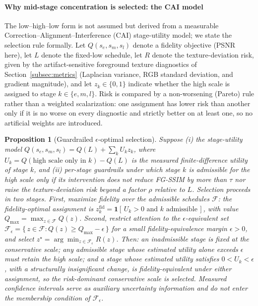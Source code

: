 \documentclass[times,twocolumn,final]{elsarticle}
\newtheorem{proposition}{Proposition} %
\providecommand{\DIFadd}[1]{{\protect\color{blue} \sf #1}} %
\providecommand{\DIFaddbegin}{} %
\newcommand{\DIFaddincludegraphics}[2][]{{\color{blue}\fbox{\DIFOincludegraphics[#1]{#2}}}} %
\DeclareRobustCommand{\DIFaddbegin}{\DIFOaddbegin \let\includegraphics\DIFaddincludegraphics} %
\begin{document}
\DIFaddbegin \paragraph{\DIFadd{Why mid-stage concentration is selected: the CAI model}}
\DIFadd{The low--high--low form is not assumed but derived from a measurable Correction--Alignment--Interference (CAI) stage-utility model; we state the selection rule formally. Let $Q(s_e,s_m,s_l)$ denote a fidelity objective (PSNR here), let $L$ denote the fixed-low schedule, let $R$ denote the texture-deviation risk, given by the artifact-sensitive foreground texture diagnostics of Section~\ref{subsec:metrics} (Laplacian variance, RGB standard deviation, and gradient magnitude), and let $z_k\in\{0,1\}$ indicate whether the high scale is assigned to stage $k\in\{e,m,l\}$. Risk is compared by a non-worsening (Pareto) rule rather than a weighted scalarization: one assignment has lower risk than another only if it is no worse on every diagnostic and strictly better on at least one, so no artificial weights are introduced.
}

\begin{proposition}[Guardrailed $\epsilon$-optimal selection]
\label{prop:cai}
\DIFadd{Suppose (i) the stage-utility model $Q(s_e,s_m,s_l)=Q(L)+\sum_{k}U_k z_k$, where $U_k=Q(\text{high scale only in }k)-Q(L)$ is the measured finite-difference utility of stage $k$, and (ii) per-stage guardrails under which stage $k$ is admissible for the high scale only if its intervention does not reduce FG-SSIM by more than $\tau$ nor raise the texture-deviation risk beyond a factor $\rho$ relative to $L$. Selection proceeds in two stages. First, maximize fidelity over the admissible schedules $\mathcal{F}$: the fidelity-optimal assignment is $z_k^{\mathrm{fid}}=\mathbf{1}[\,U_k>0 \text{ and } k \text{ admissible}\,]$, with value $Q_{\max}=\max_{z\in\mathcal{F}}Q(z)$. Second, restrict attention to the $\epsilon$-equivalent set $\mathcal{F}_\epsilon=\{\,z\in\mathcal{F}: Q(z)\ge Q_{\max}-\epsilon\,\}$ for a small fidelity-equivalence margin $\epsilon>0$, and select $z^{\star}=\arg\min_{z\in\mathcal{F}_\epsilon}R(z)$. Then: an inadmissible stage is fixed at the conservative scale; any admissible stage whose estimated utility alone exceeds $\epsilon$ must retain the high scale; and a stage whose estimated utility satisfies $0<U_k<\epsilon$, with a structurally insignificant change, is fidelity-equivalent under either assignment, so the risk-dominant conservative scale is selected. Measured confidence intervals serve as auxiliary uncertainty information and do not enter the membership condition of $\mathcal{F}_\epsilon$.
}\end{proposition}
\end{document}
